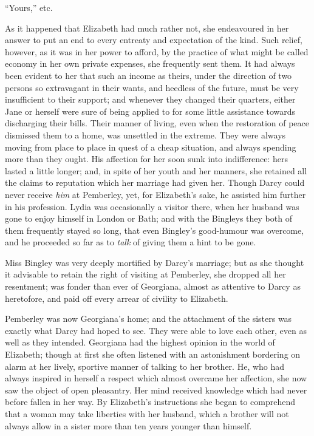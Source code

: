 \documentclass[12pt]{book}
\begin{document}
``Yours,'' etc.

As it happened that Elizabeth had much rather not, she endeavoured in her answer to put an end to every entreaty and expectation of the kind. Such relief, however, as it was in her power to afford, by the practice of what might be called economy in her own private expenses, she frequently sent them. It had always been evident to her that such an income as theirs, under the direction of two persons so extravagant in their wants, and heedless of the future, must be very insufficient to their support; and whenever they changed their quarters, either Jane or herself were sure of being applied to for some little assistance towards discharging their bills. Their manner of living, even when the restoration of peace dismissed them to a home, was unsettled in the extreme. They were always moving from place to place in quest of a cheap situation, and always spending more than they ought. His affection for her soon sunk into indifference: hers lasted a little longer; and, in spite of her youth and her manners, she retained all the claims to reputation which her marriage had given her. Though Darcy could never receive \textit{him} at Pemberley, yet, for Elizabeth's sake, he assisted him further in his profession. Lydia was occasionally a visitor there, when her husband was gone to enjoy himself in London or Bath; and with the Bingleys they both of them frequently stayed so long, that even Bingley's good-humour was overcome, and he proceeded so far as to \textit{talk} of giving them a hint to be gone.

Miss Bingley was very deeply mortified by Darcy's marriage; but as she thought it advisable to retain the right of visiting at Pemberley, she dropped all her resentment; was fonder than ever of Georgiana, almost as attentive to Darcy as heretofore, and paid off every arrear of civility to Elizabeth.

Pemberley was now Georgiana's home; and the attachment of the sisters was exactly what Darcy had hoped to see. They were able to love each other, even as well as they intended. Georgiana had the highest opinion in the world of Elizabeth; though at first she often listened with an astonishment bordering on alarm at her lively, sportive manner of talking to her brother. He, who had always inspired in herself a respect which almost overcame her affection, she now saw the object of open pleasantry. Her mind received knowledge which had never before fallen in her way. By Elizabeth's instructions she began to comprehend that a woman may take liberties with her husband, which a brother will not always allow in a sister more than ten years younger than himself.
\end{document}

